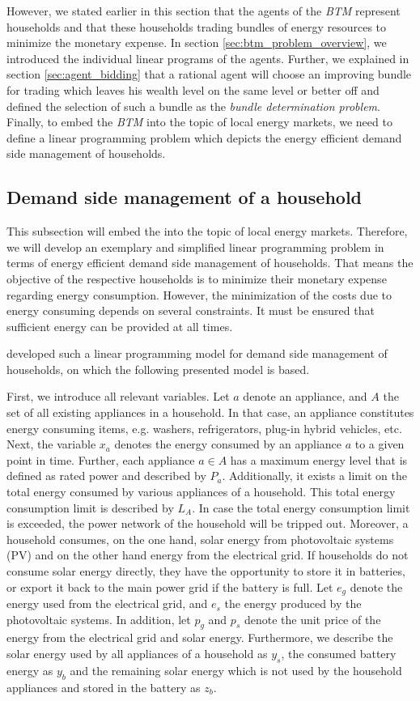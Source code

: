 However, we stated earlier in this section that the agents of the \textit{BTM} represent households
and that these households trading bundles of energy resources to minimize the monetary expense. 
In section \ref{sec:btm_problem_overview}, we introduced the individual linear programs of the agents.
Further, we explained in section \ref{sec:agent_bidding} that a rational agent will choose an improving bundle for 
trading which leaves his wealth level on the same level or better off and defined the selection of such a bundle 
as the \textit{bundle determination problem}.
Finally, to embed the \textit{BTM} into the topic of local energy markets, we need to define 
a linear programming problem which depicts the energy efficient demand side management of households.

\subsection{Demand side management of a household}
This subsection will embed the  into the topic of local energy markets. 
Therefore, we will develop an exemplary and simplified linear programming problem in terms of energy efficient demand side management of households. 
That means the objective of the respective households is to minimize their monetary expense regarding energy consumption.
However, the minimization of the costs due to energy consuming depends on several constraints. 
It must be ensured that sufficient energy can be provided at all times.

 developed such a linear programming model for demand side management of households, on which the following
presented model is based. 

First, we introduce all relevant variables. Let $a$ denote an appliance, and $A$ the set of all existing appliances in a household.
In that case, an appliance constitutes energy consuming items, e.g. washers, refrigerators, plug-in hybrid vehicles, etc.
Next, the variable $x_{a}$ denotes the energy consumed by an appliance $a$ to a given point in time. 
Further, each appliance $a \in A$ has a maximum energy level that is defined as rated power and described by $P_{a}$.
Additionally, it exists a limit on the total energy consumed by various appliances of a household. This total energy consumption limit is described by $L_{A}$. In case the total energy consumption limit is exceeded, the power network of the household will be tripped out.
Moreover, a household consumes, on the one hand, solar energy from
photovoltaic systems (PV) and on the other hand energy from the electrical grid. 
If households do not consume solar energy directly, they have the opportunity to 
store it in batteries, or export it back to the main power grid if the battery is full.
Let $e_{g}$ denote the energy used from the electrical grid, and $e_{s}$ the energy produced by the photovoltaic systems.
In addition, let $p_{g}$ and $p_{s}$ denote the unit price of the energy from the electrical grid and solar energy.
Furthermore, we describe the solar energy used by all appliances of a household as $y_{s}$, the consumed battery energy 
as $y_{b}$ and the remaining solar energy which is not used by the household appliances and stored in the battery as $z_{b}$.

